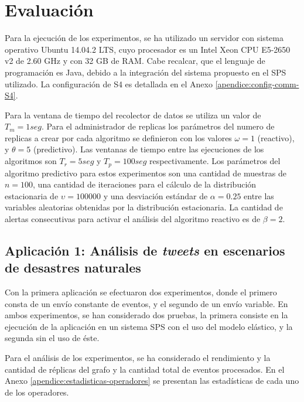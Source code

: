\section{Evaluaci\'on}
Para la ejecuci\'on de los experimentos, se ha utilizado un servidor con sistema operativo Ubuntu 14.04.2 LTS, cuyo procesador es un Intel Xeon CPU E5-2650 v2 de 2.60 GHz y con 32 GB de RAM. Cabe recalcar, que el lenguaje de programaci\'on es Java, debido a la integraci\'on del sistema propuesto en el SPS utilizado. La configuraci\'on de S4 es detallada en el Anexo \ref{apendice:config-comm-S4}.

Para la ventana de tiempo del recolector de datos se utiliza un valor de $T_m = 1seg$. Para el administrador de replicas los par\'ametros del numero de replicas a crear por cada algoritmo se definieron con los valores $\omega = 1$ (reactivo), y $\theta = 5$ (predictivo). Las ventanas de tiempo entre las ejecuciones de los algoritmos son $T_r = 5seg$ y $T_p = 100seg$ respectivamente. Los par\'ametros del algoritmo predictivo para estos experimentos son una cantidad de muestras de $n = 100$, una cantidad de iteraciones para el c\'alculo de la distribuci\'on estacionaria de $\upsilon = 100000$ y una desviaci\'on est\'andar de $\alpha = 0.25$ entre las variables aleatorias obtenidas por la distribuci\'on estacionaria. La cantidad de alertas consecutivas para activar el an\'alisis del algoritmo reactivo es de $\beta = 2$.

\subsection{Aplicaci\'on 1: An\'alisis de \textit{tweets} en escenarios de desastres naturales}
Con la primera aplicaci\'on se efectuaron dos experimentos, donde el primero consta de un env\'io constante de eventos, y el segundo de un env\'io variable. En ambos experimentos, se han considerado dos pruebas, la primera consiste en la ejecuci\'on de la aplicaci\'on en un sistema SPS con el uso del modelo el\'astico, y la segunda sin el uso de \'este.


Para el an\'alisis de los experimentos, se ha considerado \normalsize{el rendimiento y la cantidad de r\'eplicas del grafo} y la cantidad total de eventos procesados. \normalsize{En el Anexo} \ref{apendice:estadisticas-operadores} \normalsize{se presentan las estad\'isticas de cada uno de los operadores.}

